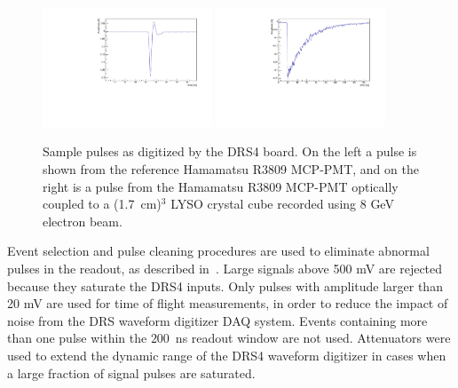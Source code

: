 \begin{figure}[h] \centering
\includegraphics[width=0.45\textwidth]{figs/RefPulse} 
\includegraphics[width=0.45\textwidth]{figs/run064_event506} 
\caption{\small Sample pulses as digitized by the DRS4 board. 
On the left a pulse is shown from the reference Hamamatsu R3809 MCP-PMT, 
and on the right is a pulse from the Hamamatsu R3809 MCP-PMT
optically coupled to a (1.7~cm)$^{3}$ LYSO crystal cube
recorded using  8 GeV electron beam.} 
\label{fig:PulseShapes}
\end{figure}

Event selection and pulse cleaning procedures are used to eliminate abnormal
pulses in the readout, as described in~\cite{MCPFastCaloNIMA}. Large signals
above 500 mV are rejected because they saturate the DRS4 inputs. Only pulses
with amplitude larger than 20 mV are used for time of flight measurements, in
order to reduce the impact of noise from the DRS waveform digitizer DAQ system.
Events containing more than one pulse within the $200$~ns readout window are not
used. Attenuators were used to extend the dynamic range of the DRS4
waveform digitizer in cases when a large fraction of signal pulses are saturated.

